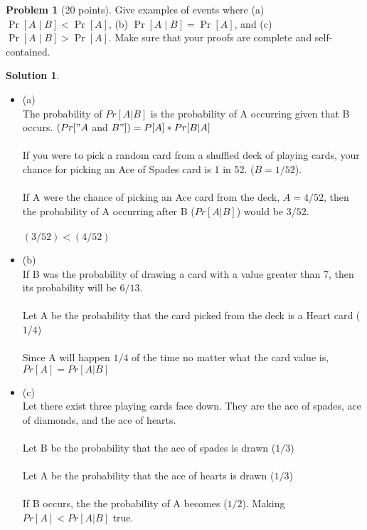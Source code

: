 \documentclass{article}
\theoremstyle{definition}
\newtheorem{problem}{Problem}
\newtheorem*{solution}{Solution}
\begin{document}
\newpage

\begin{problem}[20 points] 
Give examples of events where (a) $\Pr[A \mid B] < \Pr[A]$, 
(b) $\Pr[A \mid B] =  \Pr[A]$, and (c) $\Pr[A \mid B] > \Pr[A]$. Make
sure that your proofs are complete and self-contained. 
\end{problem}
\begin{solution} \\
\begin{itemize}
    \item (a)\\
    The probability of $Pr[A|B]$ is the probability of A occurring given that B occurs. $(Pr["A$ and $B"]) = P[A] * Pr[B|A]$\\
    \\
    If you were to pick a random card from a shuffled deck of playing cards, your chance for picking an Ace of Spades card is 1 in 52. ($B = 1/52$).\\
    \\
    If A were the chance of picking an Ace card from the deck, $A = 4/52$, then the probability of A occurring after B ($Pr[A|B]$) would be $3/52$.\\
    \\
    $(3/52) < (4/52)$
    
    \item (b)\\
    If B was the probability of drawing a card with a value greater than 7, then its probability will be $6/13$.\\
    \\
    Let A be the probability that the card picked from the deck is a Heart card ($1/4$)\\
    \\
    Since A will happen $1/4$ of the time no matter what the card value is, $Pr[A] = Pr[A|B]$\\
    
    \item (c)\\
    Let there exist three playing cards face down. They are the ace of spades, ace of diamonds, and the ace of hearts.\\
    \\
    Let B be the probability that the ace of spades is drawn ($1/3$)\\
    \\
    Let A be the probability that the ace of hearts is drawn ($1/3$)\\
    \\
    If B occurs, the the probability of A becomes ($1/2$). Making $Pr[A] < Pr[A|B]$ true.\\
    
    
\end{itemize}
\end{solution}
\end{document}

